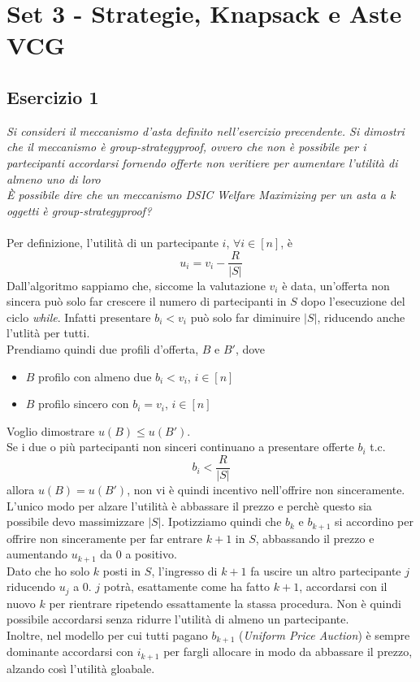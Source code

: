 \documentclass{article}
\begin{document}
    \section{Set 3 - Strategie, Knapsack e Aste VCG}
        \subsection{Esercizio 1}
            \textit{Si consideri il meccanismo d'asta definito nell'esercizio precendente. Si dimostri che il meccanismo è group-strategyproof, ovvero che non è possibile per i partecipanti accordarsi fornendo offerte non veritiere per aumentare l'utilità di almeno uno di loro}\\
            \textit{È possibile dire che un meccanismo DSIC Welfare Maximizing per un asta a $ k $ oggetti è group-strategyproof?}\\
            \\
            Per definizione, l'utilità di un partecipante $ i $, $ \forall i \in [n] $, è
            \[
                u_i = v_i - \frac{R}{\vert S \vert}    
            \]
            Dall'algoritmo sappiamo che, siccome la valutazione $ v_i $ è data, un'offerta non sincera può solo far crescere il numero di partecipanti in $ S $ dopo l'esecuzione del ciclo \textit{while}. Infatti presentare $ b_i < v_i $ può solo far diminuire $ \vert S \vert $, riducendo anche l'utlità per tutti.\\
            Prendiamo quindi due profili d'offerta, $ B $ e $ B' $, dove
            \begin{itemize}
                \item $ B $ profilo con almeno due $ b_i < v_i $, $ i \in [n] $
                \item $ B $ profilo sincero con $ b_i = v_i $, $ i \in [n] $
            \end{itemize}
            Voglio dimostrare $ u(B) \leq u(B') $.\\
            Se i due o più partecipanti non sinceri continuano a presentare offerte $ b_i $ t.c.
            \[
                b_i < \frac{R}{\vert S \vert}    
            \]
            allora $ u(B) = u(B') $, non vi è quindi incentivo nell'offrire non sinceramente.\\
            L'unico modo per alzare l'utilità è abbassare il prezzo e perchè questo sia possibile devo massimizzare $ \vert S \vert $. Ipotizziamo quindi che $ b_k $ e $ b_{k + 1} $ si accordino per offrire non sinceramente per far entrare $ k + 1 $ in $ S $, abbassando il prezzo e aumentando $ u_{k + 1} $ da 0 a positivo.\\
            Dato che ho solo $ k $ posti in $ S $, l'ingresso di $ k + 1 $ fa uscire un altro partecipante $ j $ riducendo $ u_j $ a 0. $ j $ potrà, esattamente come ha fatto $ k + 1 $, accordarsi con il nuovo $ k $ per rientrare ripetendo essattamente la stassa procedura. Non è quindi possibile accordarsi senza ridurre l'utilità di almeno un partecipante.\\
            Inoltre, nel modello per cui tutti pagano $ b_{k + 1} $ (\textit{Uniform Price Auction}) è sempre dominante accordarsi con $ i_{k + 1} $ per fargli allocare in modo da abbassare il prezzo, alzando così l'utilità gloabale.
        \newpage
\end{document}
